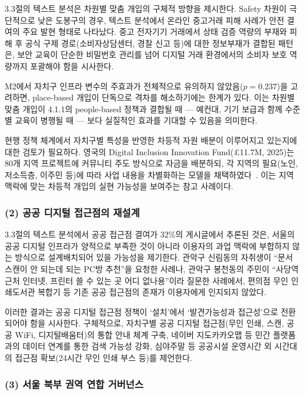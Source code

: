 3.3절의 텍스트 분석은 차원별 맞춤 개입의 구체적 방향을 제시한다. Safety 차원이 극단적으로 낮은 도봉구의 경우, 텍스트 분석에서 온라인 중고거래 피해 사례가 안전 결여의 주요 발현 형태로 나타났다. 중고 전자기기 거래에서 상태 검증 역량의 부재와 피해 후 공식 구제 경로(소비자상담센터, 경찰 신고 등)에 대한 정보부재가 결합된 패턴은, 보안 교육이 단순한 비밀번호 관리를 넘어 디지털 거래 환경에서의 소비자 보호 역량까지 포괄해야 함을 시사한다.

M2에서 자치구 인프라 변수의 주효과가 전체적으로 유의하지 않았음($p = 0.237$)을 고려하면, place-based 개입이 단독으로 격차를 해소하기에는 한계가 있다. 이는 차원별 맞춤 개입이 4.1.1의 people-based 정책과 결합될 때 --- 예컨대, 기기 보급과 함께 수준별 교육이 병행될 때 --- 보다 실질적인 효과를 기대할 수 있음을 의미한다.

현행 정책 체계에서 자치구별 특성을 반영한 차등적 자원 배분이 이루어지고 있는지에 대한 검토가 필요하다. 영국의 Digital Inclusion Innovation Fund(\pounds11.7M, 2025)는 80개 지역 프로젝트에 커뮤니티 주도 방식으로 자금을 배분하되, 각 지역의 필요(노인, 저소득층, 이주민 등)에 따라 사업 내용을 차별화하는 모델을 채택하였다~\citep{UKDSIT2025}. 이는 지역 맥락에 맞는 차등적 개입의 실현 가능성을 보여주는 참고 사례이다.

\subsubsection*{(2) 공공 디지털 접근점의 재설계}

3.3절의 텍스트 분석에서 공공 접근점 결여가 32\%의 게시글에서 추론된 것은, 서울의 공공 디지털 인프라가 양적으로 부족한 것이 아니라 이용자의 과업 맥락에 부합하지 않는 방식으로 설계\textperiodcentered{}배치되어 있을 가능성을 제기한다. 관악구 신림동의 자취생이 ``문서 스캔이 안 되는데 되는 PC방 추천''을 요청한 사례나, 관악구 봉천동의 주민이 ``사당역 근처 인터넷, 프린터 쓸 수 있는 곳 어디 없나용''이라 질문한 사례에서, 편의점 무인 인쇄\textperiodcentered{}도서관 복합기 등 기존 공공 접근점의 존재가 이용자에게 인지되지 않았다.

이러한 결과는 공공 디지털 접근점 정책이 `설치'에서 `발견가능성과 접근성'으로 전환되어야 함을 시사한다. 구체적으로, 자치구별 공공 디지털 접근점(무인 인쇄, 스캔, 공공 WiFi, 디지털배움터)의 통합 안내 체계 구축, 네이버 지도\textperiodcentered{}카카오맵 등 민간 플랫폼과의 데이터 연계를 통한 검색 가능성 강화, 심야\textperiodcentered{}주말 등 공공시설 운영시간 외 시간대의 접근점 확보(24시간 무인 인쇄 부스 등)를 제언한다.

\subsubsection*{(3) 서울 북부 권역 연합 거버넌스}

